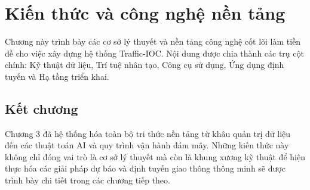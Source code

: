 \section{Kiến thức và công nghệ nền tảng}
\label{ch:3}

Chương này trình bày các cơ sở lý thuyết và nền tảng công nghệ cốt lõi làm tiền đề cho việc xây dựng hệ thống Traffic-IOC. Nội dung được chia thành các trụ cột chính: Kỹ thuật dữ liệu, Trí tuệ nhân tạo, Công cụ sử dụng, Ứng dụng định tuyến và Hạ tầng triển khai.






\subsection{Kết chương}
Chương 3 đã hệ thống hóa toàn bộ tri thức nền tảng từ khâu quản trị dữ liệu đến các thuật toán AI và quy trình vận hành đám mây. Những kiến thức này không chỉ đóng vai trò là cơ sở lý thuyết mà còn là khung xương kỹ thuật để hiện thực hóa các giải pháp dự báo và định tuyến giao thông thông minh sẽ được trình bày chi tiết trong các chương tiếp theo.
